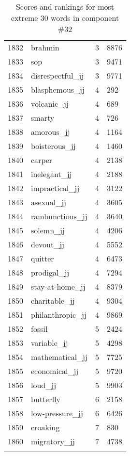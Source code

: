 \begin{longtable}[!htbp]{| rlr@{.}l |}
    1832 & brahmin & 3 & 8876 \\
    1833 & sop & 3 & 9471 \\
    1834 & disrespectful\_jj & 3 & 9771 \\
    1835 & blasphemous\_jj & 4 & 292 \\
    1836 & volcanic\_jj & 4 & 689 \\
    1837 & smarty & 4 & 726 \\
    1838 & amorous\_jj & 4 & 1164 \\
    1839 & boisterous\_jj & 4 & 1460 \\
    1840 & carper & 4 & 2138 \\
    1841 & inelegant\_jj & 4 & 2188 \\
    1842 & impractical\_jj & 4 & 3122 \\
    1843 & asexual\_jj & 4 & 3605 \\
    1844 & rambunctious\_jj & 4 & 3640 \\
    1845 & solemn\_jj & 4 & 4206 \\
    1846 & devout\_jj & 4 & 5552 \\
    1847 & quitter & 4 & 6473 \\
    1848 & prodigal\_jj & 4 & 7294 \\
    1849 & stay-at-home\_jj & 4 & 8379 \\
    1850 & charitable\_jj & 4 & 9304 \\
    1851 & philanthropic\_jj & 4 & 9869 \\
    1852 & fossil & 5 & 2424 \\
    1853 & variable\_jj & 5 & 4298 \\
    1854 & mathematical\_jj & 5 & 7725 \\
    1855 & economical\_jj & 5 & 9720 \\
    1856 & loud\_jj & 5 & 9903 \\
    1857 & butterfly & 6 & 2158 \\
    1858 & low-pressure\_jj & 6 & 6426 \\
    1859 & croaking & 7 & 830 \\
    1860 & migratory\_jj & 7 & 4738 \\
    \hline
    \caption{Scores and rankings for most extreme 30 words in component \#32} \\
\end{longtable}
